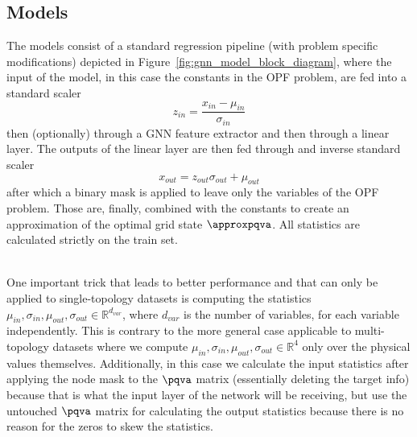 \subsection*{Models}

The models consist of a standard regression pipeline (with problem specific modifications) depicted in
Figure~\ref{fig:gnn_model_block_diagram}, where the input of the model, in this case the constants in the OPF problem,
are fed into a standard scaler \[z_{in} = \displaystyle\frac{x_{in} - \mu_{in}}{\sigma_{in}}\] then (optionally) through a GNN
feature extractor and then through a linear layer.
The outputs of the linear layer are then fed through and inverse standard scaler \[x_{out} = z_{out}\sigma_{out} + \mu_{out}\]
after which a binary mask is applied to leave only the variables of the OPF problem.
Those are, finally, combined with the constants to create an approximation of the optimal grid state $\approxpqva$.
All statistics are calculated strictly on the train set.

\mbox{}\\


One important trick that leads to better performance and that can only be applied to single-topology datasets is computing the statistics
$\mu_{in}, \sigma_{in}, \mu_{out}, \sigma_{out} \in \mathbb{R}^{d_{var}}$, where $d_{var}$ is the number of variables, for each variable
independently.
This is contrary to the more general case applicable to multi-topology datasets where we compute
$\mu_{in}, \sigma_{in}, \mu_{out}, \sigma_{out} \in \mathbb{R}^4$ only over the physical values themselves.
Additionally, in this case we calculate the input statistics after applying the node mask to the $\pqva$ matrix
(essentially deleting the target info) because that is what the input layer of the network will be receiving, but
use the untouched $\pqva$ matrix for calculating the output statistics because there is no reason for the zeros
to skew the statistics.

\mbox{}\\